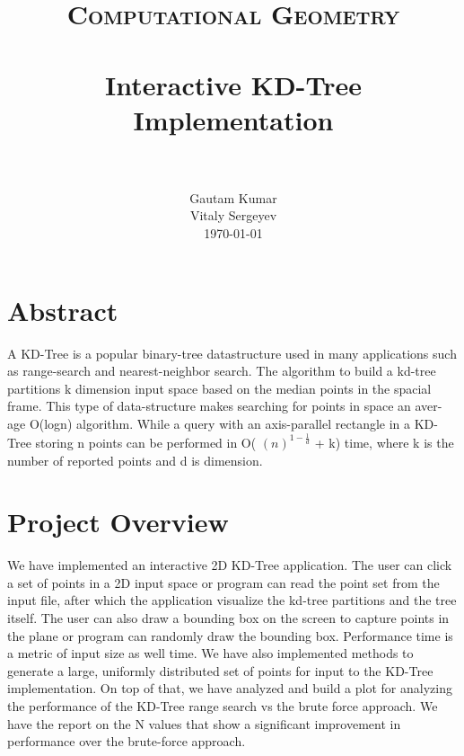 \documentclass[paper=a4, fontsize=11pt]{scrartcl}
\title{
		\usefont{OT1}{bch}{b}{n}
		\normalfont \normalsize \textsc{Computational Geometry} \\ [25pt]
		\horrule{0.5pt} \\[0.4cm]
		\huge Interactive KD-Tree Implementation \\
		\horrule{2pt} \\[0.5cm]
}
\author{
		\normalfont 								\normalsize
        Gautam Kumar  \\[-3pt]		\normalsize
        Vitaly Sergeyev \\[-3pt]    \normalsize
        \today
}
\date{}
\numberwithin{equation}{section}		%
\numberwithin{figure}{section}			%
\numberwithin{table}{section}				%
\begin{document}
\maketitle
\section{Abstract}
A KD-Tree is a popular binary-tree datastructure used in many applications such
as range-search and nearest-neighbor search. The algorithm to build a kd-tree
partitions k dimension input space based on the median points in the spacial
frame. This type of data-structure makes searching for points in space an aver-
age O(logn) algorithm. While a query with an axis-parallel rectangle in a KD-Tree storing n points can be performed in O( $(n)^{1 - \frac{1}{d}}$ + k) time, where k is the number of reported points and d is dimension.

\section{Project Overview}
We have implemented an interactive 2D KD-Tree application. The user can click a set
of points in a 2D input space or program can read the point set from the input file, after which the application visualize the kd-tree partitions and the tree itself. The user can also draw a bounding box on the screen to capture points in the plane or program can randomly draw the bounding box. Performance time is a metric of input size as well time. We have also implemented methods to generate a large, uniformly distributed set of points for input to the KD-Tree implementation. On top of that, we have analyzed and build a plot for analyzing the performance of the KD-Tree range search vs the brute force approach. We have the report on the N values that show a significant improvement in performance over the brute-force approach.
\end{document}

